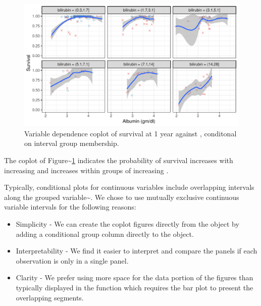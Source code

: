 \documentclass[article]{jss}
\begin{document}
\begin{Schunk}
\begin{figure}[!htb]

{\centering \includegraphics{fig-rfs/rfs-bili-coplot-1} 

}

\caption[Variable dependence coplot of survival at 1 year against , conditonal on  interval group membership]{Variable dependence coplot of survival at 1 year against , conditonal on  interval group membership.}\label{fig:bili-coplot}
\end{figure}
\end{Schunk}

The  coplot of
Figure\textasciitilde{}\ref{fig:bili-coplot} indicates the probability
of survival increases with increasing  and increases
within groups of increasing .

Typically, conditional plots for continuous variables include
overlapping intervals along the grouped
variable\textasciitilde{}\citep{cleveland:1993}. We chose to use
mutually exclusive continuous variable intervals for the following
reasons:

\begin{itemize}
 \item Simplicity - We can create the coplot figures directly from the  object by adding a conditional group column directly to the object.

 \item Interpretability - We find it easier to interpret and compare the panels if each observation is only in a single panel.

 \item Clarity - We prefer using more space for the data portion of the figures than typically displayed in the  function which requires the bar plot to present the overlapping segments.
 \end{itemize}
\end{document}
